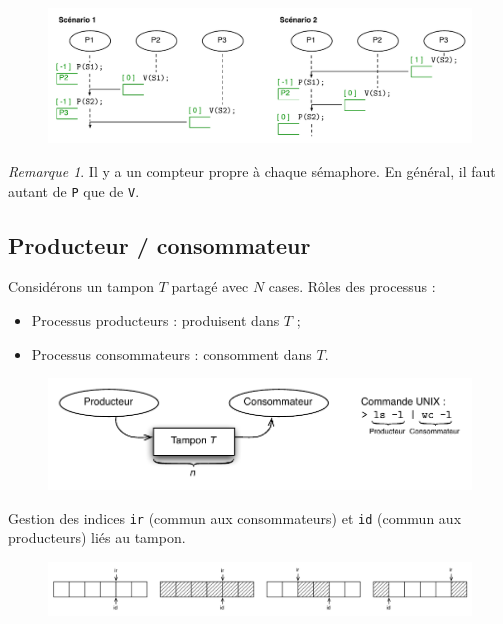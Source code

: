 \documentclass[11pt,english,french]{scrreprt}
\theoremstyle{remark}
\newtheorem*{rem*}{Remarque}
\theoremstyle{definition}
\begin{document}
\begin{figure}[h!]
	\center
	\includegraphics[scale=.85]{img/barriere3}
	\vspace{-10pt}
\end{figure}                                 

\begin{rem*}
	Il y a un compteur propre à chaque sémaphore. En général, il faut autant de \lstinline!P! que de \lstinline!V!.
\end{rem*}

\subsection{Producteur / consommateur}
Considérons un tampon $T$ partagé avec $N$ cases. Rôles des processus : \begin{itemize}
\item Processus producteurs : produisent dans $T$ ;
\item Processus consommateurs : consomment dans $T$.
\end{itemize}

\begin{figure}[h!]
	\center
	\vspace{-10pt}
	\includegraphics[scale=.85]{img/prod-cons}
	\vspace{-15pt}
\end{figure}

Gestion des indices \lstinline!ir! (commun aux consommateurs) et \lstinline!id! (commun aux producteurs) liés au tampon.
\begin{figure}[h!]
	\center
	\vspace{-20pt}
	\includegraphics[scale=.55]{img/multiprod-cons}
	\vspace{-10pt}
\end{figure}
\end{document}
